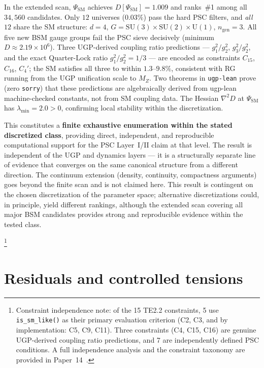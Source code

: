 \documentclass[11pt,twocolumn]{article}
\theoremstyle{remark}
\begin{document}
In the extended scan, $\Psi_{\mathrm{SM}}$ achieves $D[\Psi_{\mathrm{SM}}] = 1.009$ and ranks~\#1 among all
$34{,}560$ candidates.
Only $12$ universes ($0.03\%$) pass the hard PSC filters, and \emph{all $12$} share the SM
structure: $d=4$, $G = \mathrm{SU}(3)\times\mathrm{SU}(2)\times\mathrm{U}(1)$,
$n_{\mathrm{gen}}=3$.
All five new BSM gauge groups fail the PSC sieve decisively (minimum $D \approx 2.19\times10^6$).
Three UGP-derived coupling ratio predictions --- $g_1^2/g_2^2$, $g_3^2/g_2^2$, and the exact
Quarter-Lock ratio $g_1^2/g_2^2=1/3$ --- are encoded as constraints $C_{15}$, $C_{16}$, $C_4'$;
the SM satisfies all three to within $1.3$--$9.8\%$, consistent with RG running from the UGP
unification scale to $M_Z$.
Two theorems in \texttt{ugp-lean} prove (zero \texttt{sorry}) that these predictions are
algebraically derived from ugp-lean machine-checked constants, not from SM coupling data.
The Hessian $\nabla^2 D$ at $\Psi_{\mathrm{SM}}$ has $\lambda_{\min}=2.0>0$, confirming local
stability within the discretization.

This constitutes a \textbf{finite exhaustive enumeration within the stated discretized class},
providing direct, independent, and reproducible computational support for the PSC Layer~I/II
claim at that level.
The result is independent of the UGP and dynamics layers — it is a structurally separate line
of evidence that converges on the same canonical structure from a different direction.
The continuum extension (density, continuity, compactness arguments) goes beyond the finite
scan and is not claimed here.
This result is contingent on the chosen discretization of the parameter space; alternative
discretizations could, in principle, yield different rankings, although the extended scan
covering all major BSM candidates provides strong and reproducible evidence within the tested class.

\footnote{Constraint independence note: of the 15 TE2.2 constraints, 5 use
\texttt{is\_sm\_like()} as their primary evaluation criterion (C2, C3, and by implementation:
C5, C9, C11). Three constraints (C4, C15, C16) are genuine UGP-derived coupling ratio
predictions, and 7 are independently defined PSC conditions. A full independence
analysis and the constraint taxonomy are provided in Paper~14~\cite{SpivackPSCConcordance}.}

\section{Residuals and controlled tensions}
\end{document}
